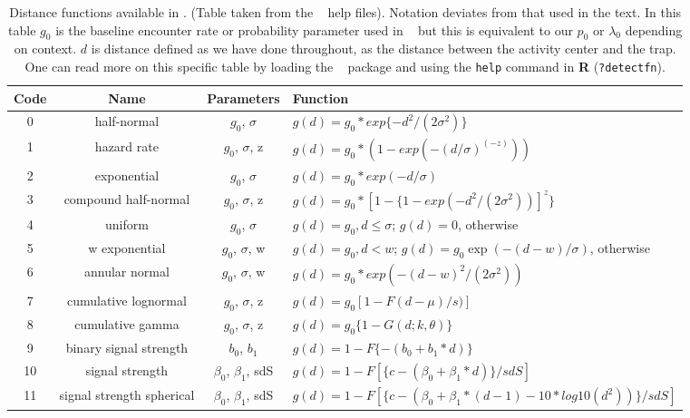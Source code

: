 \begin{table}[ht]
\centering
\caption{Distance functions available in \secr.  (Table taken from the \secr~
help files). Notation deviates from that used in the text.
In this table $g_{0}$ is the baseline encounter rate or probability
parameter used in \secr~ but this is equivalent to our $p_{0}$ or
$\lambda_{0}$ depending on context. $d$ is distance defined as we have done throughout,
as the distance between the activity center and the trap.
One can read more on this specific table by loading the \secr~ package and using the
{\tt help} command in {\bf R} ({\tt ?detectfn}).
}
\begin{tabular}{cccl}
\hline \hline
Code & Name & Parameters & Function  \\ \hline
0 & half-normal &$g_0$, $\sigma$          &  $g(d) = g_0 * exp\{-d^2 / (2  \sigma^2) \}$  \\
1 &hazard rate  & $g_0$, $\sigma$, z      &  $g(d) = g_0 * (1 - exp(- (d / \sigma) ^(-z) ))$ \\
2 &exponential   &$g_0$, $\sigma$    &  $g(d) = g_0 * exp(- d / \sigma)$ \\
3 &compound half-normal  & $g_0$, $\sigma$, z & $g(d) = g_0 * [1 - \{1 - exp(-d^2 / (2 \sigma^2))]^z\}$ \\
4 &uniform     & $g_0$, $\sigma$     &
\parbox[t]{2in}{ $g(d) = g_{0}, d \leq \sigma$; \\
                 $g(d)= 0$, otherwise
} \\
5 &w exponential            & $g_0$, $\sigma$, w &
\parbox[t]{2in}{ $g(d) = g_{0}, d < w$; \\
                 $g(d) = g_{0} \exp(- (d - w) / \sigma)$, otherwise
} \\
6 &annular normal           & $g_0$, $\sigma$, w & $g(d) = g_0 * exp(-(d-w)^2 / (2 \sigma^2))$ \\
7 &cumulative lognormal     & $g_0$, $\sigma$, z & $g(d) = g_0 [1 -F{(d-\mu)/s)}]$  \\
8 &cumulative gamma         & $g_0$, $\sigma$, z  & $g(d) = g_0 \{ 1 - G (d; k,  \theta) \}$  \\
9 &binary signal strength   & $b_0$, $b_1$       & $g(d) = 1 - F \{- (b_0 + b_1 * d) \}$ \\
10&signal strength          & $\beta_0$, $\beta_1$, sdS  &
  $g(d) = 1 - F[ \{c - (\beta_0 + \beta_1 * d)\} / sdS]$  \\
11&signal strength spherical&  $\beta_0$, $\beta_1$, sdS & 
\parbox[t]{2in}{ $g(d) = 1 - F[\{c - (\beta_0 + \beta_1 * (d-1)- 10 * log10 ( d^2 ) ) \} / sdS ]$ 
} \\

\end{tabular}
\label{covariates.tab.detmodels}
\end{table}

